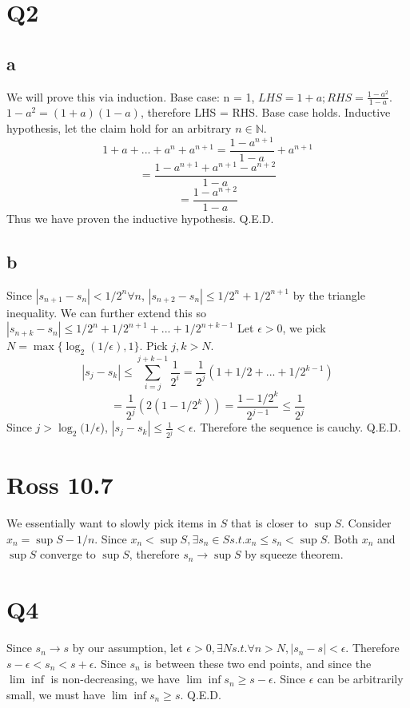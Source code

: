 \documentclass[12pt]{article}
\newcommand{\N}{\mathbb{N}}
\begin{document}
\section{Q2}
\subsection{a}
We will prove this via induction.
\newline
Base case: n = 1, $LHS = 1+a; RHS = \frac{1-a^{2}}{1-a}$. $1-a^2 = (1+a)(1-a)$, therefore LHS = RHS. Base case holds.
\newline
Inductive hypothesis, let the claim hold for an arbitrary $n \in \N$.
$$1+a+...+a^n+a^{n+1} = \frac{1-a^{n+1}}{1-a}+a^{n+1}$$
$$=\frac{1-a^{n+1}+a^{n+1}-a^{n+2}}{1-a}$$
$$=\frac{1-a^{n+2}}{1-a}$$
Thus we have proven the inductive hypothesis. Q.E.D.

\subsection{b}
Since $|s_{n+1}-s_n|<1/2^n \forall n$, $|s_{n+2}-s_n| \leq 1/2^n + 1/2^{n+1}$ by the triangle inequality. We can further extend this so $|s_{n+k}-s_n| \leq 1/2^n + 1/2^{n+1} + ... +1/2^{n+k-1}$
\newline
Let $\epsilon > 0$, we pick $N = \max \{ \log_2 (1/\epsilon), 1\}$. Pick $j,k > N$.
$$|s_j - s_k| \leq \sum ^{j+k-1}_{i=j} \frac{1}{2^i} = \frac{1}{2^j}(1+1/2+...+1/2^{k-1})$$
$$=\frac{1}{2^j}(2(1-1/2^{k})) = \frac{1-1/2^k}{2^{j-1}} \leq \frac{1}{2^j}$$
Since $j> \log_2 (1/\epsilon$), $|s_j - s_k|\leq \frac{1}{2^j} < \epsilon$.
\newline
Therefore the sequence is cauchy. Q.E.D.
\newpage


\section{Ross 10.7}
We essentially want to slowly pick items in $S$ that is closer to $\sup S$.
\newline
Consider $x_n = \sup S - 1/n$. Since $x_n < \sup S, \exists s_n \in S s.t. x_n \leq s_n < \sup S$. Both $x_n$ and $\sup S$ converge to $\sup S$, therefore $s_n \to \sup S$ by squeeze theorem.
\newpage


\section{Q4}
Since $s_n \to s$ by our assumption, let $\epsilon > 0, \exists N s.t. \forall n>N, |s_n - s| < \epsilon$.
\newline
Therefore $s-\epsilon < s_n < s + \epsilon$. Since $s_n$ is between these two end points, and since the $\lim \inf$ is non-decreasing, we have $\lim \inf s_n \geq s-\epsilon$.
\newline
Since $\epsilon$ can be arbitrarily small, we must have $\lim \inf s_n \geq s$. Q.E.D.
\newpage
\end{document}
